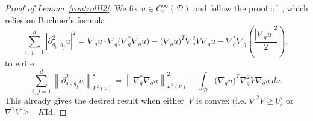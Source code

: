 \documentclass[AHL,Unicode,longabstracts,MathTools,published]{cedram}
\newcommand{\rmc}{\mathrm{c}}
\newcommand{\Id}{\mathrm{Id}}
\newcommand{\cD}{\mathcal{D}}
\renewcommand{\geq}{\geqslant}
\begin{document}
\begin{proof}[Proof of Lemma~\ref{controlH2}]
We fix $u \in C_\rmc^\infty(\cD)$ and follow the proof of~\cite[Lemma~2.3]{CLW19}, which relies on Bochner's formula
\[
\sum_{i,\,j=1}^{d} \left|\partial_{q_i,\,q_j}^2 u\right|^2 = \nabla_q u\cdot \nabla_q \big(\nabla^{*}_q\nabla_q u\big) - \big(\nabla_q u\big)^T\nabla_q^2 V \nabla_q u-\nabla_q^{*}\nabla_q\left(\frac{\left|\nabla_q u\right|^2}{2}\right),
\]
to write
\begin{equation}\label{Bochnereq}
\sum_{i,\,j=1}^{d} \left\|\partial_{q_i,\,q_j}^2 u\right\|^2_{L^2(\nu)} = \left\|\nabla_q^{*}\nabla_q u\right\|^2_{L^2(\nu)} - \int_\cD \big(\nabla_q u\big)^T \nabla_q^2 V \nabla_q u \, d\nu.
\end{equation}
This already gives the desired result when either~$V$ is convex (i.e. $\nabla^2 V \geq 0$) or $\nabla^2 V \geq -K \Id$.


\end{proof}
\end{document}

